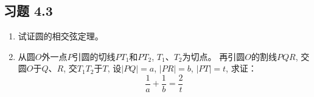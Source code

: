 \begin{solution}
    
\end{solution}

\begin{solution}
    
\end{solution}

\begin{solution}
    
\end{solution}


























































































\subsection*{习题 4.3}
\begin{enumerate}
    \item 试证圆的相交弦定理。
    \item 从圆$O$外一点$P$引圆的切线$PT_1$和$PT_2$, $T_1$、$T_2$为切点。
再引圆$O$的割线$PQR$, 交圆$O$于$Q$、$R$, 交$T_1T_2$于$T$, 
设$|PQ|=a$, $|PR|=b$, $|PT|=t$, 求证：
\[\frac{1}{a}+\frac{1}{b}=\frac{2}{t}\]
\end{enumerate}

